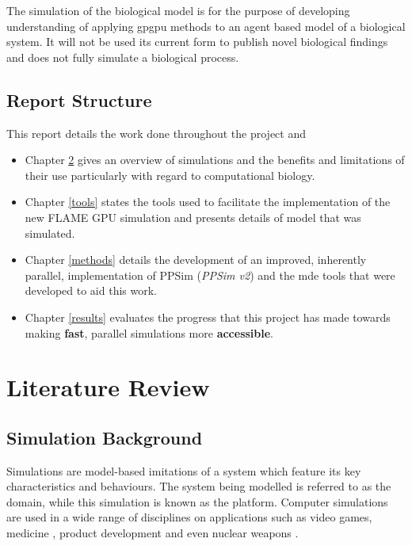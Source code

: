 \documentclass{UoYCSproject}
\begin{document}
The simulation of the biological model is for the purpose of developing understanding of applying \gls{gpgpu} methods to an agent based model of a biological system. It will not be used its current form to publish novel biological findings and does not fully simulate a biological process.

\section{Report Structure}
This report details the work done throughout the project and 

\begin{itemize}
    \item Chapter \ref{lit_review} gives an overview of simulations and the benefits and limitations of their use particularly with regard to computational biology.
    \item Chapter \ref{tools} states the tools used to facilitate the implementation of the new \gls{FLAME GPU} simulation and presents details of model that was simulated.
    \item Chapter \ref{methods} details the development of an improved, inherently parallel, implementation of PPSim (\textit{PPSim v2}) and the \gls{mde} tools that were developed to aid this work.
    \item Chapter \ref{results} evaluates the progress that this project has made towards making \textbf{fast}, parallel simulations more \textbf{accessible}.
\end{itemize}

\chapter{Literature Review}
\label{lit_review}
%

\section{Simulation Background}
\label{simulation}
Simulations are model-based imitations of a system which feature its key characteristics and behaviours.
The system being modelled is referred to as the domain, while this simulation is known as the platform.
Computer simulations are used in a wide range of disciplines on applications such as video games, medicine \cite{abm_case_studies_ycil, healthcare_population}, product development \cite{sim_manufacturing} and even nuclear weapons \cite{nuclear_simulation, gizmodo_nuclear}.
\end{document}
